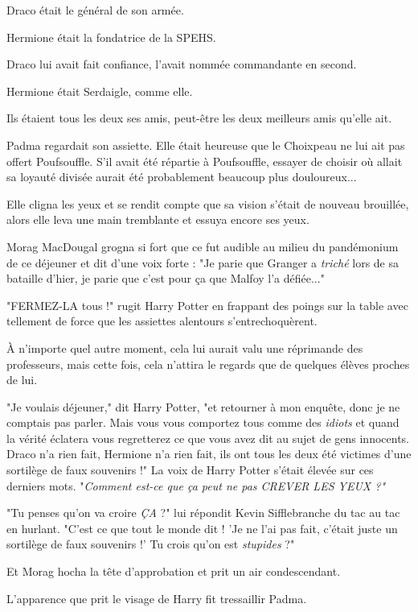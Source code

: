 Draco était le général de son armée.

Hermione était la fondatrice de la SPEHS.

Draco lui avait fait confiance, l'avait nommée commandante en second.

Hermione était Serdaigle, comme elle.

Ils étaient tous les deux ses amis, peut-être les deux meilleurs amis qu'elle ait.

Padma regardait son assiette. Elle était heureuse que le Choixpeau ne lui ait pas offert Poufsouffle. S'il avait été répartie à Poufsouffle, essayer de choisir où allait sa loyauté divisée aurait été probablement beaucoup plus douloureux...

Elle cligna les yeux et se rendit compte que sa vision s'était de nouveau brouillée, alors elle leva une main tremblante et essuya encore ses yeux.

Morag MacDougal grogna si fort que ce fut audible au milieu du pandémonium de ce déjeuner et dit d'une voix forte : "Je parie que Granger a \emph{triché}  lors de sa bataille d'hier, je parie que c'est pour ça que Malfoy l'a défiée..."

"FERMEZ-LA tous !" rugit Harry Potter en frappant des poings sur la table avec tellement de force que les assiettes alentours s'entrechoquèrent.

À n'importe quel autre moment, cela lui aurait valu une réprimande des professeurs, mais cette fois, cela n'attira le regards que de quelques élèves proches de lui.

"Je voulais déjeuner," dit Harry Potter, "et retourner à mon enquête, donc je ne comptais pas parler. Mais vous vous comportez tous comme des \emph{idiots } et quand la vérité éclatera vous regretterez ce que vous avez dit au sujet de gens innocents. Draco n'a rien fait, Hermione n'a rien fait, ils ont tous les deux été victimes d'une sortilège de faux souvenirs !" La voix de Harry Potter s'était élevée sur ces derniers mots. "\emph{Comment est-ce que ça peut ne pas CREVER LES YEUX ?"} 

"Tu penses qu'on va croire \emph{ÇA } ?" lui répondit Kevin Sifflebranche du tac au tac en hurlant. "C'est ce que tout le monde dit ! 'Je ne l'ai pas fait, c'était juste un sortilège de faux souvenirs !' Tu crois qu'on est \emph{stupides } ?"

Et Morag hocha la tête d'approbation et prit un air condescendant.

L'apparence que prit le visage de Harry fit tressaillir Padma.


